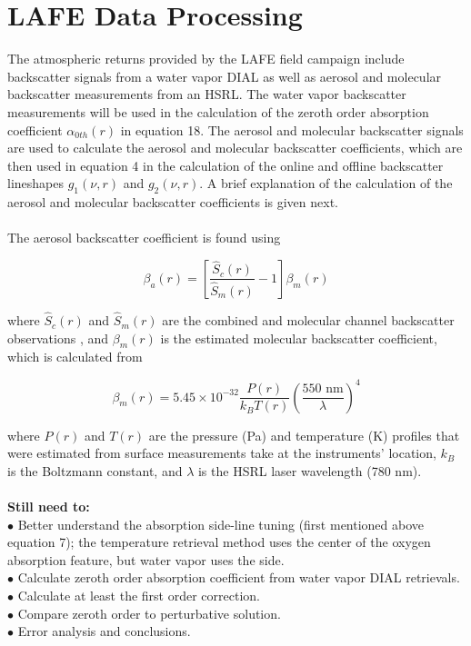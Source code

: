 \documentclass[twoside]{article}
\begin{document}
\section{LAFE Data Processing}

The atmospheric returns provided by the LAFE field campaign include backscatter signals from a water vapor DIAL as well as aerosol and molecular backscatter measurements from an HSRL.
The water vapor backscatter measurements will be used in the calculation of the zeroth order absorption coefficient $\alpha_{0th}(r)$ in equation 18.
The aerosol and molecular backscatter signals are used to calculate the aerosol and molecular backscatter coefficients, which are then used in equation 4 in the calculation of the online and offline backscatter lineshapes $g_1(\nu,r)$ and $g_2(\nu,r)$.
A brief explanation of the calculation of the aerosol and molecular backscatter coefficients is given next.\\
\\
The aerosol backscatter coefficient is found using \cite{Hayman2017}

\begin{equation}
	\beta_a(r) = \left[ \frac{\hat{S}_c(r)}{\hat{S}_m(r)}-1 \right] \beta_m(r)
\end{equation}

\noindent where $\hat{S}_c(r)$ and $\hat{S}_m(r)$ are the combined and molecular channel backscatter observations \cite{Hayman2017}, and $\beta_m(r)$ is the estimated molecular backscatter coefficient, which is calculated from \cite{Measures1984}

\begin{equation}
	\beta_m(r) = 5.45 \times 10^{-32} \frac{P(r)}{k_B T(r)} \left( \frac{550 \text{ nm}}{\lambda} \right) ^4
\end{equation}

\noindent where $P(r)$ and $T(r)$ are the pressure (Pa) and temperature (K) profiles that were estimated from surface measurements take at the instruments' location, $k_B$ is the Boltzmann constant, and $\lambda$ is the HSRL laser wavelength (780 nm).\\
\\
\textbf{Still need to:}\\
$\bullet$ Better understand the absorption side-line tuning (first mentioned above equation 7); the temperature retrieval method uses the center of the oxygen absorption feature, but water vapor uses the side.\\
$\bullet$ Calculate zeroth order absorption coefficient from water vapor DIAL retrievals.\\
$\bullet$ Calculate at least the first order correction.\\
$\bullet$ Compare zeroth order to perturbative solution.\\
$\bullet$ Error analysis and conclusions.
\end{document}
